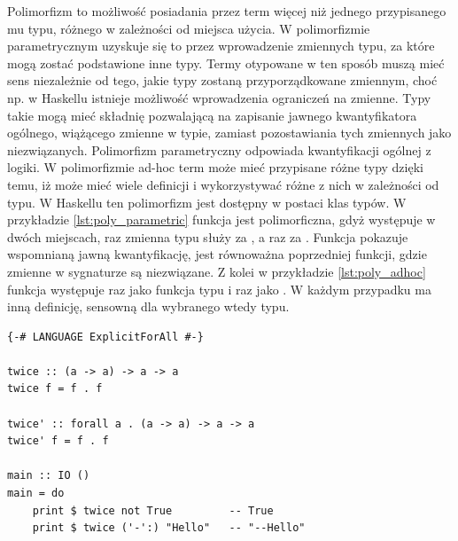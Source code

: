 {Polimorfizm to możliwość posiadania przez term więcej niż jednego przypisanego
mu typu, różnego w zależności od miejsca użycia. W polimorfizmie parametrycznym
uzyskuje się to przez wprowadzenie zmiennych typu, za które mogą zostać
podstawione inne typy. Termy otypowane w ten sposób muszą mieć sens niezależnie
od tego, jakie typy zostaną przyporządkowane zmiennym, choć np. w Haskellu
istnieje możliwość wprowadzenia ograniczeń na zmienne. Typy takie mogą mieć
składnię pozwalającą na zapisanie jawnego kwantyfikatora ogólnego, wiążącego
zmienne w typie, zamiast pozostawiania tych zmiennych jako
niezwiązanych.
Polimorfizm parametryczny odpowiada kwantyfikacji ogólnej z
logiki. W polimorfizmie ad-hoc term może mieć przypisane różne typy dzięki temu,
iż może mieć wiele definicji i wykorzystywać różne z nich w zależności od
typu.
W Haskellu ten polimorfizm jest dostępny w postaci klas
typów\cite{TAPL}. W przykładzie \ref{lst:poly_parametric} funkcja 
jest polimorficzna,
gdyż występuje w dwóch miejscach, raz zmienna typu 
służy za , a raz za  . Funkcja  pokazuje
wspomnianą jawną kwantyfikację, jest równoważna poprzedniej funkcji, gdzie
zmienne w sygnaturze są niezwiązane. Z kolei w przykładzie \ref{lst:poly_adhoc}
funkcja  występuje raz jako funkcja typu  i raz jako
. W każdym przypadku ma inną definicję, sensowną dla
wybranego wtedy typu. 

\begin{lstlisting}[float,label={lst:poly_parametric},
                   caption={Przykład użycia polimorfizmu parametrycznego w Haskellu.}]
{-# LANGUAGE ExplicitForAll #-}

twice :: (a -> a) -> a -> a
twice f = f . f

twice' :: forall a . (a -> a) -> a -> a
twice' f = f . f

main :: IO ()
main = do
    print $ twice not True         -- True
    print $ twice ('-':) "Hello"   -- "--Hello"
\end{lstlisting}

}
